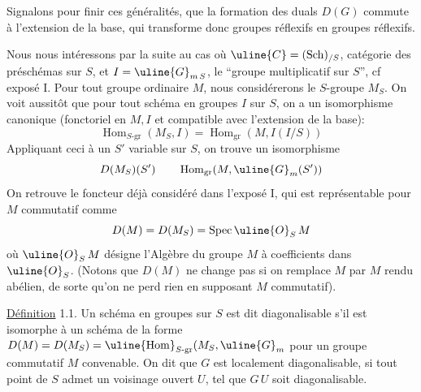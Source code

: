 Signalons pour finir ces généralités, que la formation des duals
$D(G)$ commute à l'extension de la base, qui transforme donc groupes
réflexifs en groupes réflexifs.

Nous nous intéressons par la suite au cas où
$\uline{C}=(\mathrm{Sch})_{/S}$, catégorie
des préschémas sur $S$, et $I=\uline{G}_{m\,S}$,
le ``groupe multiplicatif sur $S$'',
cf exposé I. Pour tout groupe  ordinaire $M$, nous considérerons
le $S$-groupe $M_S$. On voit aussitôt que pour tout schéma en groupes
$I$ sur $S$, on a un isomorphisme canonique
(fonctoriel en $M,I$ et compatible avec l'extension de la base):
\[
\operatorname{Hom}_{S\text{-gr}}(M_S,I)
=\operatorname{Hom}_{\mathrm{gr}}(M,I(I/S))
\]
Appliquant ceci à un $S'$ variable sur $S$, on trouve un isomorphisme
\[
D(M_S)(S')\qquad\operatorname{Hom}_{\mathrm{gr}}(M,\uline{G}_m(S'))
\]
On retrouve le foncteur déjà considéré dans l'exposé I,
qui est représentable 
pour $M$ commutatif comme
\[
D(M)=D(M_S)=\operatorname{Spec}\uline{O}_S\,M
\]
où $\uline{O}_S\,M$ désigne l'Algèbre du groupe $M$ à coefficients dans
$\uline{O}_S$. (Notons
que $D(M)$ ne change pas si on remplace $M$ par $M$ rendu
abélien, de sorte 
qu'on ne perd rien en supposant $M$ commutatif).

\uline{Définition} 1.1. Un schéma en groupes  sur $S$ est dit diagonalisable
s'il est isomorphe à un schéma de la forme 
$D(M)=D(M_S)=\uline{\operatorname{Hom}}_{S\text{-gr}}(M_S,\uline{G}_m$
pour un groupe commutatif $M$ convenable. On dit que $G$ est localement
diagonalisable, si tout point de $S$ admet un voisinage ouvert $U$, tel que
$G\,U$ soit diagonalisable.

